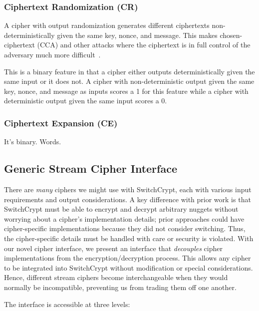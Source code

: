 \subsubsection{Ciphertext Randomization (CR)}

A cipher with output randomization generates different ciphertexts
non-\\deterministically given the same key, nonce, and message. This makes
chosen-ciphertext (CCA) and other attacks where the ciphertext is in full
control of the adversary much more difficult~\cite{Freestyle}.

This is a binary feature in that a cipher either outputs deterministically given
the same input or it does not. A cipher with non-deterministic output given the
same key, nonce, and message as inputs scores a 1 for this feature while a
cipher with deterministic output given the same input scores a 0.

\subsubsection{Ciphertext Expansion (CE)}

It's binary. Words.

\subsection{Generic Stream Cipher Interface} \label{subsec:interface}

There are \emph{many} ciphers we might use with SwitchCrypt, each with various
input requirements and output considerations. A key difference with prior work
is that SwitchCrypt must be able to encrypt and decrypt arbitrary nuggets
without worrying about a cipher's implementation details; prior approaches could
have cipher-specific implementations because they did not consider switching.
Thus, the cipher-specific details must be handled with care or security is
violated. With our novel cipher interface, we present an interface that
\emph{decouples} cipher implementations from the encryption/decryption process.
This allows any cipher to be integrated into SwitchCrypt without modification or
special considerations. Hence, different stream ciphers become interchangeable
when they would normally be incompatible, preventing us from trading them off
one another.

The interface is accessible at three levels:

